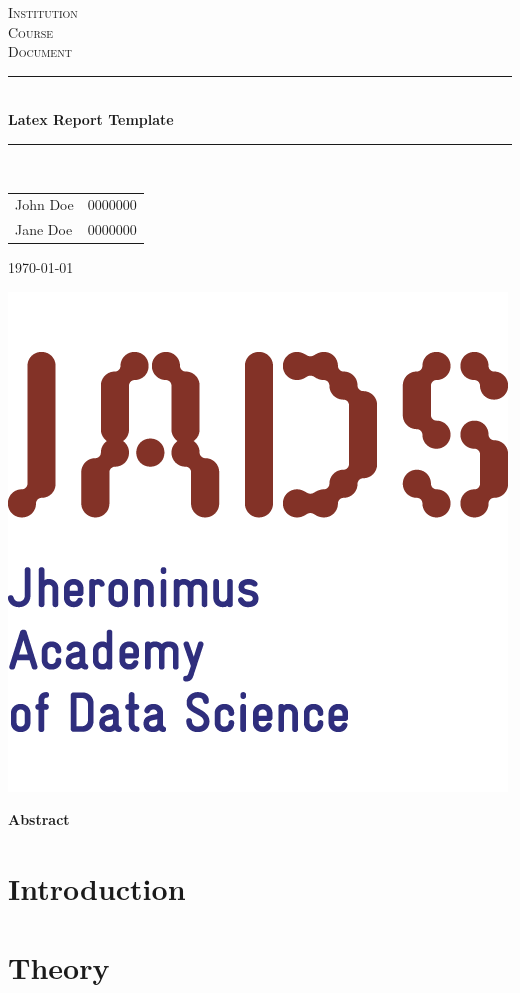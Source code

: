 \documentclass[10pt, letterpaper]{report}
\begin{document}
\begin{titlepage}
\begin{center}
    \textsc{\LARGE Institution}\\[1.5cm]
    \textsc{\Large Course}\\[0.5cm]
    \textsc{\large Document}\\[0.5cm]

    \rule{\linewidth}{0.25mm}\\[0.4cm]
    {\huge\bfseries Latex Report Template}\\[0.4cm]
    \rule{\linewidth}{0.25mm}\\[1.5cm]

    \begin{table}[H]
        \large
        \centering
        \begin{tabular}{l l}
            John Doe & 0000000 \\
            Jane Doe & 0000000
        \end{tabular}
        \vspace{2cm}
    \end{table}

    \large\today

    \vfill

    \includegraphics[width=0.25\linewidth]{Fig/logo.png}\\[1cm]
\end{center}
\end{titlepage}

\Large{\textbf{Abstract}}

\normalsize{}

\tableofcontents

\chapter{Introduction}
\label{sec:introduction}


\chapter{Theory}
\label{sec:theory}

\end{document}

